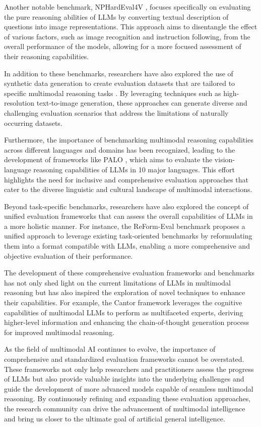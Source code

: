 \documentclass[11pt]{article}
\begin{document}
Another notable benchmark, NPHardEval4V \cite{ref316}, focuses specifically on evaluating the pure reasoning abilities of LLMs by converting textual description of questions into image representations. This approach aims to disentangle the effect of various factors, such as image recognition and instruction following, from the overall performance of the models, allowing for a more focused assessment of their reasoning capabilities.

In addition to these benchmarks, researchers have also explored the use of synthetic data generation to create evaluation datasets that are tailored to specific multimodal reasoning tasks \cite{ref317}. By leveraging techniques such as high-resolution text-to-image generation, these approaches can generate diverse and challenging evaluation scenarios that address the limitations of naturally occurring datasets.

Furthermore, the importance of benchmarking multimodal reasoning capabilities across different languages and domains has been recognized, leading to the development of frameworks like PALO \cite{ref223}, which aims to evaluate the vision-language reasoning capabilities of LLMs in 10 major languages. This effort highlights the need for inclusive and comprehensive evaluation approaches that cater to the diverse linguistic and cultural landscape of multimodal interactions.

Beyond task-specific benchmarks, researchers have also explored the concept of unified evaluation frameworks that can assess the overall capabilities of LLMs in a more holistic manner. For instance, the ReForm-Eval benchmark \cite{ref318} proposes a unified approach to leverage existing task-oriented benchmarks by reformulating them into a format compatible with LLMs, enabling a more comprehensive and objective evaluation of their performance.

The development of these comprehensive evaluation frameworks and benchmarks has not only shed light on the current limitations of LLMs in multimodal reasoning but has also inspired the exploration of novel techniques to enhance their capabilities. For example, the Cantor framework \cite{ref319} leverages the cognitive capabilities of multimodal LLMs to perform as multifaceted experts, deriving higher-level information and enhancing the chain-of-thought generation process for improved multimodal reasoning.

As the field of multimodal AI continues to evolve, the importance of comprehensive and standardized evaluation frameworks cannot be overstated. These frameworks not only help researchers and practitioners assess the progress of LLMs but also provide valuable insights into the underlying challenges and guide the development of more advanced models capable of seamless multimodal reasoning. By continuously refining and expanding these evaluation approaches, the research community can drive the advancement of multimodal intelligence and bring us closer to the ultimate goal of artificial general intelligence.
\end{document}
